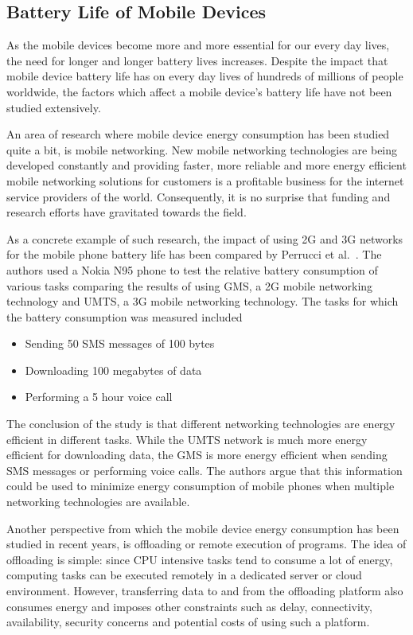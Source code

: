 \subsection{Battery Life of Mobile Devices}

As the mobile devices become more and more essential for our every day lives, the need for longer and longer battery lives increases. Despite the impact that mobile device battery life has on every day lives of hundreds of millions of people worldwide, the factors which affect a mobile device's battery life have not been studied extensively.

An area of research where mobile device energy consumption has been studied quite a bit, is mobile networking. New mobile networking technologies are being developed constantly and providing faster, more reliable and more energy efficient mobile networking solutions for customers is a profitable business for the internet service providers of the world. Consequently, it is no surprise that funding and research efforts have gravitated towards the field.  

As a concrete example of such research, the impact of using 2G and 3G networks for the mobile phone battery life has been compared by Perrucci et al.~\cite{5357972}. The authors used a Nokia N95 phone to test the relative battery consumption of various tasks comparing the results of using GMS, a 2G mobile networking technology and UMTS, a 3G mobile networking technology. The tasks for which the battery consumption was measured included 

\begin{itemize}
\item Sending 50 SMS messages of 100 bytes
\item Downloading 100 megabytes of data
\item Performing a 5 hour voice call 
\end{itemize} 

The conclusion of the study is that different networking technologies are energy efficient in different tasks. While the UMTS network is much more energy efficient for downloading data, the GMS is more energy efficient when sending SMS messages or performing voice calls. The authors argue that this information could be used to minimize energy consumption of mobile phones when multiple networking technologies are available.       

Another perspective from which the mobile device energy consumption has been studied in recent years, is offloading or remote execution of programs. The idea of offloading is simple: since CPU intensive tasks tend to consume a lot of energy, computing tasks can be executed remotely in a dedicated server or cloud environment. However, transferring data to and from the offloading platform also consumes energy and imposes other constraints such as delay, connectivity, availability, security concerns and potential costs of using such a platform.

